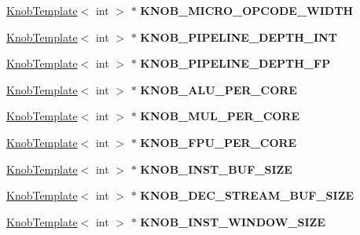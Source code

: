 \begin{DoxyCompactItemize}
\item 
\hypertarget{classall__knobs__c_a8a8c591ad7890f468b8d43edceef25ee}{
\hyperlink{classKnobTemplate}{KnobTemplate}$<$ int $>$ $\ast$ {\bfseries KNOB\_\-MICRO\_\-OPCODE\_\-WIDTH}}
\label{classall__knobs__c_a8a8c591ad7890f468b8d43edceef25ee}

\item 
\hypertarget{classall__knobs__c_ad39d25dc3a9755c99a987ac22a218429}{
\hyperlink{classKnobTemplate}{KnobTemplate}$<$ int $>$ $\ast$ {\bfseries KNOB\_\-PIPELINE\_\-DEPTH\_\-INT}}
\label{classall__knobs__c_ad39d25dc3a9755c99a987ac22a218429}

\item 
\hypertarget{classall__knobs__c_ab47f180ec7e9b016ce6a497d873b2435}{
\hyperlink{classKnobTemplate}{KnobTemplate}$<$ int $>$ $\ast$ {\bfseries KNOB\_\-PIPELINE\_\-DEPTH\_\-FP}}
\label{classall__knobs__c_ab47f180ec7e9b016ce6a497d873b2435}

\item 
\hypertarget{classall__knobs__c_afe451b702e02e0b21a9febe86b635825}{
\hyperlink{classKnobTemplate}{KnobTemplate}$<$ int $>$ $\ast$ {\bfseries KNOB\_\-ALU\_\-PER\_\-CORE}}
\label{classall__knobs__c_afe451b702e02e0b21a9febe86b635825}

\item 
\hypertarget{classall__knobs__c_a070238fa9851650ceb7c1e05526339af}{
\hyperlink{classKnobTemplate}{KnobTemplate}$<$ int $>$ $\ast$ {\bfseries KNOB\_\-MUL\_\-PER\_\-CORE}}
\label{classall__knobs__c_a070238fa9851650ceb7c1e05526339af}

\item 
\hypertarget{classall__knobs__c_ac148e7ac15a1b9e897b5e166b321d4b5}{
\hyperlink{classKnobTemplate}{KnobTemplate}$<$ int $>$ $\ast$ {\bfseries KNOB\_\-FPU\_\-PER\_\-CORE}}
\label{classall__knobs__c_ac148e7ac15a1b9e897b5e166b321d4b5}

\item 
\hypertarget{classall__knobs__c_af3292053caeec81589754f947ae6ab38}{
\hyperlink{classKnobTemplate}{KnobTemplate}$<$ int $>$ $\ast$ {\bfseries KNOB\_\-INST\_\-BUF\_\-SIZE}}
\label{classall__knobs__c_af3292053caeec81589754f947ae6ab38}

\item 
\hypertarget{classall__knobs__c_a771bfdfc2492c649b61c60a960fa6021}{
\hyperlink{classKnobTemplate}{KnobTemplate}$<$ int $>$ $\ast$ {\bfseries KNOB\_\-DEC\_\-STREAM\_\-BUF\_\-SIZE}}
\label{classall__knobs__c_a771bfdfc2492c649b61c60a960fa6021}

\item 
\hypertarget{classall__knobs__c_a0add5393d3fdcf6b600724303969d2ae}{
\hyperlink{classKnobTemplate}{KnobTemplate}$<$ int $>$ $\ast$ {\bfseries KNOB\_\-INST\_\-WINDOW\_\-SIZE}}
\label{classall__knobs__c_a0add5393d3fdcf6b600724303969d2ae}


\end{DoxyCompactItemize}
